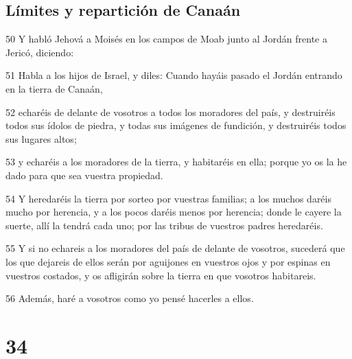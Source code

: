 \section*{Límites y repartición de Canaán}

\par 50 Y habló Jehová a Moisés en los campos de Moab junto al Jordán frente a Jericó, diciendo:
\par 51 Habla a los hijos de Israel, y diles: Cuando hayáis pasado el Jordán entrando en la tierra de Canaán,
\par 52 echaréis de delante de vosotros a todos los moradores del país, y destruiréis todos sus ídolos de piedra, y todas sus imágenes de fundición, y destruiréis todos sus lugares altos;
\par 53 y echaréis a los moradores de la tierra, y habitaréis en ella; porque yo os la he dado para que sea vuestra propiedad.
\par 54 Y heredaréis la tierra por sorteo por vuestras familias; a los muchos daréis mucho por herencia, y a los pocos daréis menos por herencia; donde le cayere la suerte, allí la tendrá cada uno; por las tribus de vuestros padres heredaréis.
\par 55 Y si no echareis a los moradores del país de delante de vosotros, sucederá que los que dejareis de ellos serán por aguijones en vuestros ojos y por espinas en vuestros costados, y os afligirán sobre la tierra en que vosotros habitareis.
\par 56 Además, haré a vosotros como yo pensé hacerles a ellos.

\chapter{34}

